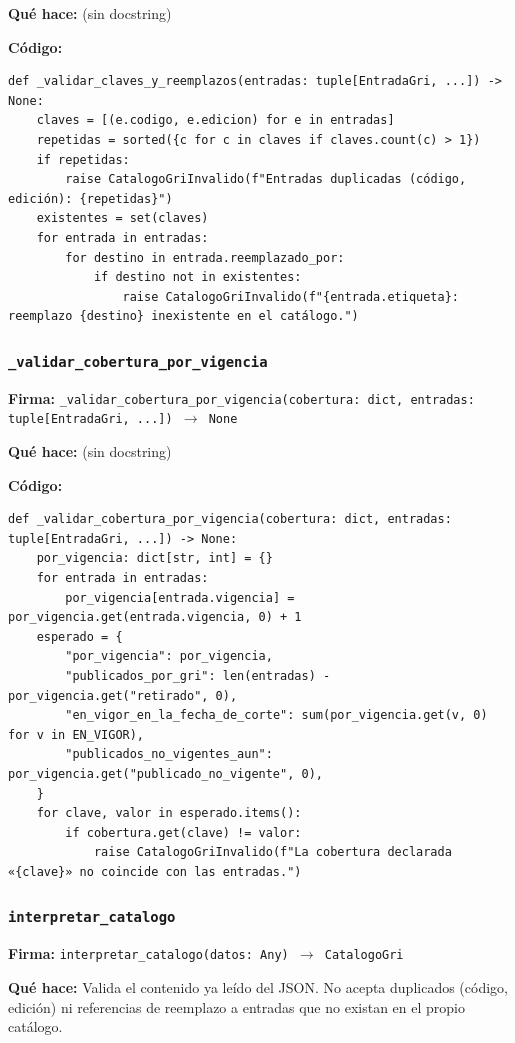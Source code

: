 \documentclass[11pt,a4paper]{article}
\begin{document}
\textbf{Qué hace:} (sin docstring)

\textbf{Código:}
\begin{lstlisting}
def _validar_claves_y_reemplazos(entradas: tuple[EntradaGri, ...]) -> None:
    claves = [(e.codigo, e.edicion) for e in entradas]
    repetidas = sorted({c for c in claves if claves.count(c) > 1})
    if repetidas:
        raise CatalogoGriInvalido(f"Entradas duplicadas (código, edición): {repetidas}")
    existentes = set(claves)
    for entrada in entradas:
        for destino in entrada.reemplazado_por:
            if destino not in existentes:
                raise CatalogoGriInvalido(f"{entrada.etiqueta}: reemplazo {destino} inexistente en el catálogo.")
\end{lstlisting}

\subsubsection*{\texttt{\_validar\_cobertura\_por\_vigencia}}
\textbf{Firma:} \texttt{\_validar\_cobertura\_por\_vigencia(cobertura: dict, entradas: tuple[EntradaGri, ...]) $\rightarrow$ None}

\textbf{Qué hace:} (sin docstring)

\textbf{Código:}
\begin{lstlisting}
def _validar_cobertura_por_vigencia(cobertura: dict, entradas: tuple[EntradaGri, ...]) -> None:
    por_vigencia: dict[str, int] = {}
    for entrada in entradas:
        por_vigencia[entrada.vigencia] = por_vigencia.get(entrada.vigencia, 0) + 1
    esperado = {
        "por_vigencia": por_vigencia,
        "publicados_por_gri": len(entradas) - por_vigencia.get("retirado", 0),
        "en_vigor_en_la_fecha_de_corte": sum(por_vigencia.get(v, 0) for v in EN_VIGOR),
        "publicados_no_vigentes_aun": por_vigencia.get("publicado_no_vigente", 0),
    }
    for clave, valor in esperado.items():
        if cobertura.get(clave) != valor:
            raise CatalogoGriInvalido(f"La cobertura declarada «{clave}» no coincide con las entradas.")
\end{lstlisting}

\subsubsection*{\texttt{interpretar\_catalogo}}
\textbf{Firma:} \texttt{interpretar\_catalogo(datos: Any) $\rightarrow$ CatalogoGri}

\textbf{Qué hace:} Valida el contenido ya leído del JSON. No acepta duplicados (código, edición)
ni referencias de reemplazo a entradas que no existan en el propio catálogo.
\end{document}
